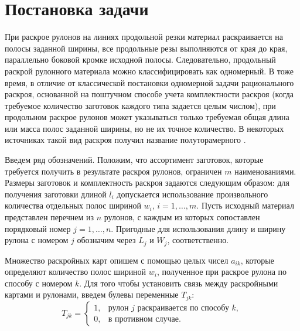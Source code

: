\documentclass[12pt]{article}
\begin{document}
\section{Постановка задачи}

При раскрое рулонов на линиях продольной резки материал раскраивается на полосы 
заданной ширины, все продольные резы выполняются от края до края, параллельно 
боковой кромке исходной полосы. Следовательно, продольный раскрой рулонного 
материала можно классифицировать как одномерный. В тоже время, в отличие от 
классической постановки одномерной задачи рационального раскроя, основанной на 
поштучном способе учета комплектности раскроя (когда требуемое количество 
заготовок каждого типа задается целым числом), при продольном раскрое рулонов 
может указываться только требуемая общая длина или масса полос заданной ширины, 
но не их точное количество. В некоторых источниках такой вид раскроя получил 
название полуторамерного \cite{song06}.

Введем ряд обозначений. Положим, что ассортимент заготовок, которые требуется 
получить в результате раскроя рулонов, ограничен $m$ наименованиями. Размеры 
заготовок и комплектность раскроя задаются следующим образом: для получения 
заготовки длиной $l_i$ допускается использование произвольного количества 
отдельных полос шириной $w_i$, $i=1,\ldots,m$. Пусть исходный материал 
представлен перечнем из $n$ рулонов, с каждым из которых сопоставлен порядковый 
номер $j=1,\ldots,n$. Пригодные для использования длину и ширину рулона с 
номером $j$ обозначим через $L_j$ и $W_j$, соответственно.

Множество раскройных карт опишем с помощью целых чисел $a_{ik}$, которые 
определяют количество полос шириной $w_i$, полученное при раскрое рулона по 
способу с номером $k$. Для того чтобы установить связь между раскройными 
картами и рулонами, введем булевы переменные $T_{jk}$:
\[ T_{jk}=\begin{cases}
             1, & \text{рулон } j \text{ раскраивается по способу } k, \\
             0, & \text{в противном случае}.
          \end{cases} \]
\end{document}

